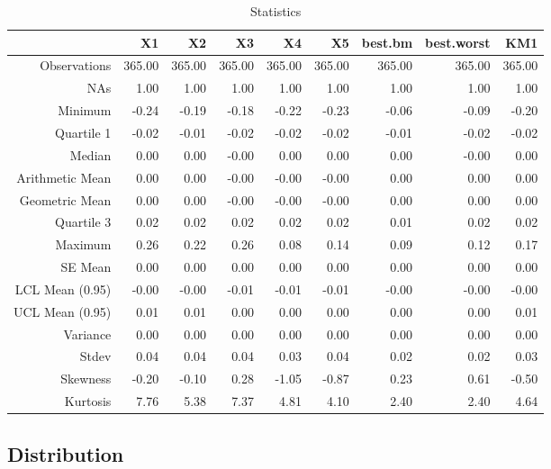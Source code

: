 \documentclass{article}
\begin{document}
\begin{table}[ht]
\begin{center}
\caption{Statistics}
\begin{tabular}{rrrrrrrrr}
  \hline
 & X1 & X2 & X3 & X4 & X5 & best.bm & best.worst & KM1 \\ 
  \hline
Observations & 365.00 & 365.00 & 365.00 & 365.00 & 365.00 & 365.00 & 365.00 & 365.00 \\ 
  NAs & 1.00 & 1.00 & 1.00 & 1.00 & 1.00 & 1.00 & 1.00 & 1.00 \\ 
  Minimum & -0.24 & -0.19 & -0.18 & -0.22 & -0.23 & -0.06 & -0.09 & -0.20 \\ 
  Quartile 1 & -0.02 & -0.01 & -0.02 & -0.02 & -0.02 & -0.01 & -0.02 & -0.02 \\ 
  Median & 0.00 & 0.00 & -0.00 & 0.00 & 0.00 & 0.00 & -0.00 & 0.00 \\ 
  Arithmetic Mean & 0.00 & 0.00 & -0.00 & -0.00 & -0.00 & 0.00 & 0.00 & 0.00 \\ 
  Geometric Mean & 0.00 & 0.00 & -0.00 & -0.00 & -0.00 & 0.00 & 0.00 & 0.00 \\ 
  Quartile 3 & 0.02 & 0.02 & 0.02 & 0.02 & 0.02 & 0.01 & 0.02 & 0.02 \\ 
  Maximum & 0.26 & 0.22 & 0.26 & 0.08 & 0.14 & 0.09 & 0.12 & 0.17 \\ 
  SE Mean & 0.00 & 0.00 & 0.00 & 0.00 & 0.00 & 0.00 & 0.00 & 0.00 \\ 
  LCL Mean (0.95) & -0.00 & -0.00 & -0.01 & -0.01 & -0.01 & -0.00 & -0.00 & -0.00 \\ 
  UCL Mean (0.95) & 0.01 & 0.01 & 0.00 & 0.00 & 0.00 & 0.00 & 0.00 & 0.01 \\ 
  Variance & 0.00 & 0.00 & 0.00 & 0.00 & 0.00 & 0.00 & 0.00 & 0.00 \\ 
  Stdev & 0.04 & 0.04 & 0.04 & 0.03 & 0.04 & 0.02 & 0.02 & 0.03 \\ 
  Skewness & -0.20 & -0.10 & 0.28 & -1.05 & -0.87 & 0.23 & 0.61 & -0.50 \\ 
  Kurtosis & 7.76 & 5.38 & 7.37 & 4.81 & 4.10 & 2.40 & 2.40 & 4.64 \\ 
   \hline
\end{tabular}
\end{center}
\end{table}
\subsection{Distribution}
\end{document}
